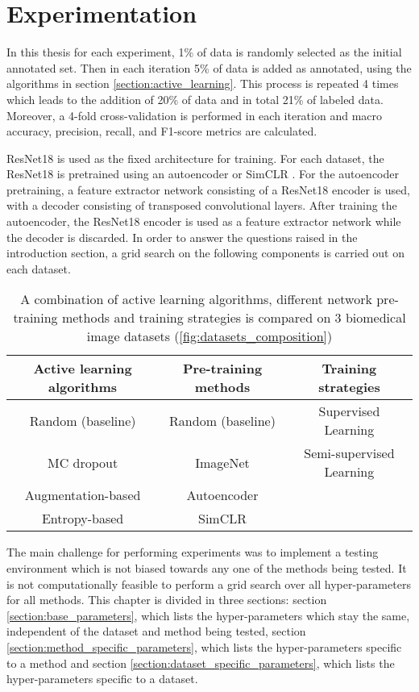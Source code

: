 
\chapter{Experimentation}\label{chapter:experiments}
In this thesis for each experiment, 1\% of data is randomly selected as the initial annotated set. Then in each iteration 5\% of data is added as annotated, using the algorithms in section \ref{section:active_learning}. This process is repeated 4 times which leads to the addition of 20\% of data and in total 21\% of labeled data. Moreover, a 4-fold cross-validation is performed in each iteration and macro accuracy, precision, recall, and F1-score metrics are calculated. 

ResNet18 \cite{he2016} is used as the fixed architecture for training. For each dataset, the ResNet18 is pretrained using an autoencoder or SimCLR \cite{chen2020}. For the autoencoder pretraining, a feature extractor network consisting of a ResNet18 encoder is used, with a decoder consisting of transposed convolutional layers. After training the autoencoder, the ResNet18 encoder is used as a feature extractor network while the decoder is discarded. 
In order to answer the questions raised in the introduction section, a grid search on the following components is carried out on each dataset.

\begin{table}[htbp]
\captionsetup{format=plain}
\centering
 \begin{tabular}{c c c} 
 \hline
 Active learning algorithms & Pre-training methods & Training strategies \\ [0.5ex] 
 \hline
 Random (baseline) & Random (baseline) & Supervised Learning \\ 
 MC dropout & ImageNet & Semi-supervised Learning \\
 Augmentation-based & Autoencoder & \\
 Entropy-based & SimCLR & \\
 \hline
\end{tabular}
\caption{A combination of active learning algorithms, different network pre-training methods and training strategies is compared on 3 biomedical image datasets (\ref{fig:datasets_composition})}
\label{table:experimental_grid}
\end{table}

The main challenge for performing experiments was to implement a testing environment which is not biased towards any one of the methods being tested. It is not computationally feasible to perform a grid search over all hyper-parameters for all methods. This chapter is divided in three sections: section \ref{section:base_parameters}, which lists the hyper-parameters which stay the same, independent of the dataset and method being tested, section \ref{section:method_specific_parameters}, which lists the hyper-parameters specific to a method and section \ref{section:dataset_specific_parameters}, which lists the hyper-parameters specific to a dataset.

